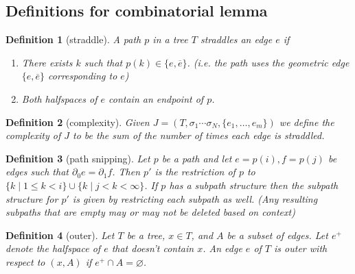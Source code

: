 \documentclass{article}
\theoremstyle{mystyle}
\newtheorem{defn}{Definition}
\theoremstyle{remark}
\begin{document}
\subsection{Definitions for combinatorial lemma}%
\begin{defn}
	[straddle]
	A path \(p\) in a tree \(T\) {\em straddles} an edge \(e\) if
	\begin{enumerate}
		\item There exists \(k\) such that \(p(k) \in  \{e, \overline{e}\}\). (i.e. the path uses the geometric edge \(\{e , \overline{e}\}\) corresponding to  \(e\))
		\item Both halfspaces of \(e\) contain an endpoint of \(p\).
	\end{enumerate}
\end{defn}
\begin{defn}
	[complexity]
	Given \(J=(T, \sigma_{1} \cdots \sigma_{N} , \{e_{1} , \ldots, e_{m}\})\) we define the {\em complexity} of \(J\) to be the sum of the number of times each edge is straddled.
\end{defn}
\begin{defn}
	[path snipping]
	Let \(p\) be a path and let \(e=p(i), f=p(j)\) be edges such that \(\partial_{0}  e = \partial_{1} f \). Then \(p'\) is the restriction of \(p\) to \(\{k\mid 1 \leq k < i\} \cup \{k \mid j < k < \infty\}\). If \(p\) has a subpath structure then the subpath structure for \(p'\) is given by restricting each subpath as well. (Any resulting subpaths that are empty may or may not be deleted based on context)
	
\end{defn}
\begin{defn}
	[outer]
	Let \(T\) be a tree, \(x \in T\), and \(A\) be a subset of edges. Let \(e^{+}\) denote the halfspace of \(e\) that doesn't contain \(x\). An edge \(e\) of \(T\) is {\em outer} with respect to \((x,A)\) if \(e^{+} \cap A=\varnothing\).  
\end{defn}
\end{document}
